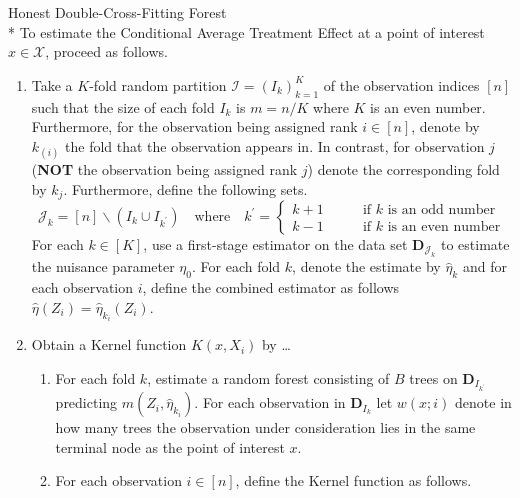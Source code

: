 \begin{boxD}
	\begin{dfn}{Honest Double-Cross-Fitting Forest}\mbox{}\\*
		To estimate the Conditional Average Treatment Effect at a point of interest $x \in \mathcal{X}$, proceed as follows.
		\begin{enumerate}
			\item Take a $K$-fold random partition $\mathcal{I} = \left(I_k\right)_{k = 1}^{K}$ of the observation indices $[n]$ such that the size of each fold $I_k$ is $m = n/K$ where $K$ is an even number.
            Furthermore, for the observation being assigned rank $i \in [n]$, denote by $k_{(i)}$ the fold that the observation appears in.
            In contrast, for observation $j$ (\textbf{NOT} the observation being assigned rank $j$) denote the corresponding fold by $k_j$.
			Furthermore, define the following sets. 
            \begin{equation}
                \mathcal{J}_k = [n] \backslash \left(I_{k} \cup I_{k^{\prime}}\right) 
                \quad \text{where} \quad
                k^{\prime} = \begin{cases}
                    k+1 \quad & \quad \text{if $k$ is an odd number} \\
                    k-1 \quad & \quad \text{if $k$ is an even number}
                \end{cases}
            \end{equation}
            For each $k \in [K]$, use a first-stage estimator on the data set $\mathbf{D}_{\mathcal{J}_{k}}$ to estimate the nuisance parameter $\eta_{0}$.
            For each fold $k$, denote the estimate by $\hat{\eta}_{k}$ and for each observation $i$, define the combined estimator as follows $\hat{\eta}(Z_i) = \hat{\eta}_{k_{i}}(Z_i)$.
            \item Obtain a Kernel function $K(x, X_{i})$ by \dots
            \begin{enumerate}
                \item For each fold $k$, estimate a random forest consisting of $B$ trees on $\mathbf{D}_{I_{k^{\prime}}}$ predicting $m(Z_{i}, \hat{\eta}_{k_{i}})$.
                For each observation in $\mathbf{D}_{I_{k}}$ let $w(x; i)$ denote in how many trees the observation under consideration lies in the same terminal node as the point of interest $x$. 
                \item For each observation $i \in [n]$, define the Kernel function as follows.
                \begin{equation}

\end{equation}
\end{enumerate}
\end{enumerate}
\end{dfn}
\end{boxD}
